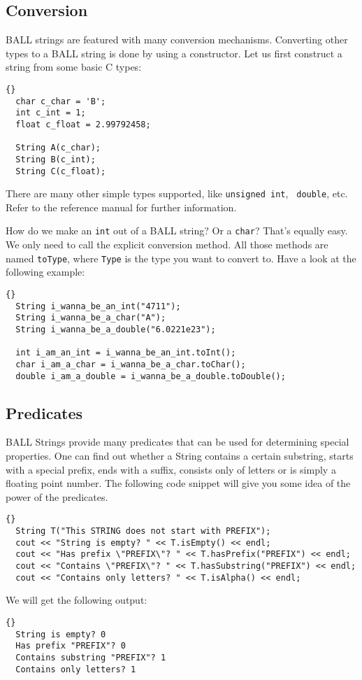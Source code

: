 \subsection{Conversion}

BALL strings are featured with many conversion mechanisms. Converting other
types to a BALL string is done by using a constructor. Let us first construct
a string from some basic C types:
\begin{lstlisting}{}
  char c_char = 'B';
  int c_int = 1;
  float c_float = 2.99792458;

  String A(c_char);
  String B(c_int);
  String C(c_float);
\end{lstlisting}
There are many other simple types supported, like {\tt unsigned int}, {\tt
double}, etc. Refer to the reference manual for further information.

\noindent
How do we make an {\tt int} out of a BALL string? Or a {\tt char}? That's
equally easy. We only need to call the explicit conversion method. All those
methods are named {\tt toType}, where {\tt Type} is the type you want to
convert to. Have a look at the following example:
\begin{lstlisting}{}
  String i_wanna_be_an_int("4711");
  String i_wanna_be_a_char("A");
  String i_wanna_be_a_double("6.0221e23");

  int i_am_an_int = i_wanna_be_an_int.toInt();
  char i_am_a_char = i_wanna_be_a_char.toChar();
  double i_am_a_double = i_wanna_be_a_double.toDouble();
\end{lstlisting}


\subsection{Predicates}

BALL Strings provide many predicates that can be used for determining special
properties. One can find out whether a String contains a certain substring, 
starts with a special prefix, ends with a suffix, consists only of letters or 
is simply a floating point number. The following code snippet will give you
some idea of the power of the predicates.
\begin{lstlisting}{}
  String T("This STRING does not start with PREFIX");
  cout << "String is empty? " << T.isEmpty() << endl;
  cout << "Has prefix \"PREFIX\"? " << T.hasPrefix("PREFIX") << endl;
  cout << "Contains \"PREFIX\"? " << T.hasSubstring("PREFIX") << endl;
  cout << "Contains only letters? " << T.isAlpha() << endl;
\end{lstlisting}
We will get the following output:
\begin{lstlisting}{}
  String is empty? 0
  Has prefix "PREFIX"? 0
  Contains substring "PREFIX"? 1
  Contains only letters? 1
\end{lstlisting}

